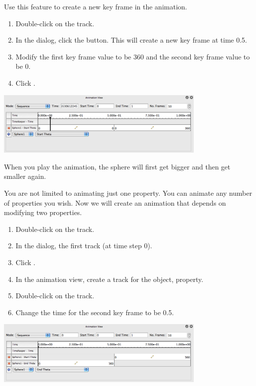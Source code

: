 Use this feature to create a new key frame in the animation.

\begin{enumerate}
  \restorecounter
\item Double-click on the  track.
\item In the  dialog, click the  button.
  This will create a new key frame at time 0.5.
\item Modify the first key frame value to be 360 and the second key frame
  value to be 0.
\item Click .
\end{enumerate}

\begin{inlinefig}
  \includegraphics[width=4in]{images/BuildAnimation2}
\end{inlinefig}

When you play the animation, the sphere will first get bigger and then get
smaller again.

You are not limited to animating just one property.  You can animate any
number of properties you wish.  Now we will create an animation that
depends on modifying two properties.

\begin{enumerate}
\item Double-click on the  track.
\item In the  dialog,  the first track
  (at time step 0).
\item Click .
\item In the animation view, create a track for the  object,
   property.
\item Double-click on the  track.
\item Change the time for the second key frame to be 0.5.
\end{enumerate}

\begin{inlinefig}
  \includegraphics[width=4in]{images/BuildAnimation3}
\end{inlinefig}

